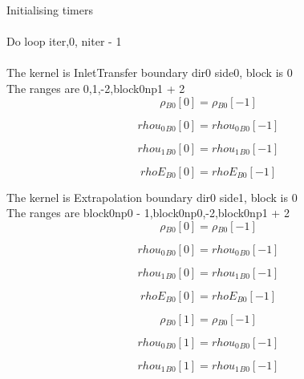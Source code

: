\documentclass{article}
\begin{document}
\noindent Initialising timers\\
\\\noindent Do loop iter,0, niter - 1\\
\\\noindent The kernel is InletTransfer boundary dir0 side0, block is 0\\\noindent The ranges are 0,1,-2,block0np1 + 2\\\begin{dmath}{\rho{_{B0}}}[{0}] = {\rho{_{B0}}}[{-1}]\end{dmath}

\begin{dmath}{rhou_{0}{_{B0}}}[{0}] = {rhou_{0}{_{B0}}}[{-1}]\end{dmath}

\begin{dmath}{rhou_{1}{_{B0}}}[{0}] = {rhou_{1}{_{B0}}}[{-1}]\end{dmath}

\begin{dmath}{rhoE{_{B0}}}[{0}] = {rhoE{_{B0}}}[{-1}]\end{dmath}

\noindent The kernel is Extrapolation boundary dir0 side1, block is 0\\\noindent The ranges are block0np0 - 1,block0np0,-2,block0np1 + 2\\\begin{dmath}{\rho{_{B0}}}[{0}] = {\rho{_{B0}}}[{-1}]\end{dmath}

\begin{dmath}{rhou_{0}{_{B0}}}[{0}] = {rhou_{0}{_{B0}}}[{-1}]\end{dmath}

\begin{dmath}{rhou_{1}{_{B0}}}[{0}] = {rhou_{1}{_{B0}}}[{-1}]\end{dmath}

\begin{dmath}{rhoE{_{B0}}}[{0}] = {rhoE{_{B0}}}[{-1}]\end{dmath}

\begin{dmath}{\rho{_{B0}}}[{1}] = {\rho{_{B0}}}[{-1}]\end{dmath}

\begin{dmath}{rhou_{0}{_{B0}}}[{1}] = {rhou_{0}{_{B0}}}[{-1}]\end{dmath}

\begin{dmath}{rhou_{1}{_{B0}}}[{1}] = {rhou_{1}{_{B0}}}[{-1}]\end{dmath}
\end{document}
